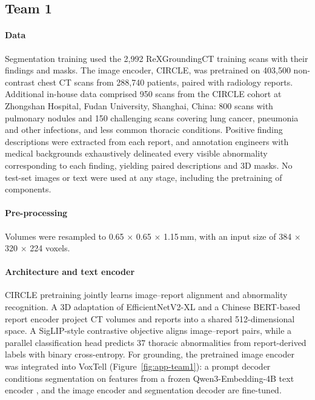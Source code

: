 \subsection{Team 1}
\label{app:team1}

\paragraph{Data} Segmentation training used the 2,992 ReXGroundingCT
training scans with their findings and masks. The image encoder, CIRCLE, was
pretrained on 403,500 non-contrast chest CT scans from 288,740
patients, paired with radiology reports. Additional in-house data comprised
950 scans from the CIRCLE cohort at Zhongshan Hospital, Fudan University,
Shanghai, China: 800 scans with pulmonary nodules and 150 challenging
scans covering lung cancer, pneumonia and other infections, and less common
thoracic conditions. Positive finding descriptions were extracted from each
report, and annotation engineers with medical backgrounds exhaustively
delineated every visible abnormality corresponding to each finding, yielding
paired descriptions and 3D masks. No test-set images or text were used at any
stage, including the pretraining of components.

\paragraph{Pre-processing} Volumes were resampled to
0.65 $\times$ 0.65 $\times$ 1.15\,mm, with an input size of
384 $\times$ 320 $\times$ 224 voxels.

\paragraph{Architecture and text encoder} CIRCLE pretraining jointly learns
image--report alignment and abnormality recognition. A 3D adaptation of
EfficientNetV2-XL \citep{tan2021efficientnetv2} and a Chinese BERT-based report
encoder project CT volumes and reports into a shared 512-dimensional space. A
SigLIP-style contrastive objective \citep{zhai2023sigmoid} aligns
image--report pairs, while a parallel classification head predicts 37 thoracic
abnormalities from report-derived labels with binary cross-entropy. For
grounding, the pretrained image encoder was integrated into VoxTell
\citep{rokuss2026voxtell} (Figure~\ref{fig:app-team1}): a prompt decoder
conditions segmentation on features from a frozen Qwen3-Embedding-4B text encoder
\citep{zhang2025qwen3}, and the image encoder and segmentation decoder are
fine-tuned.

